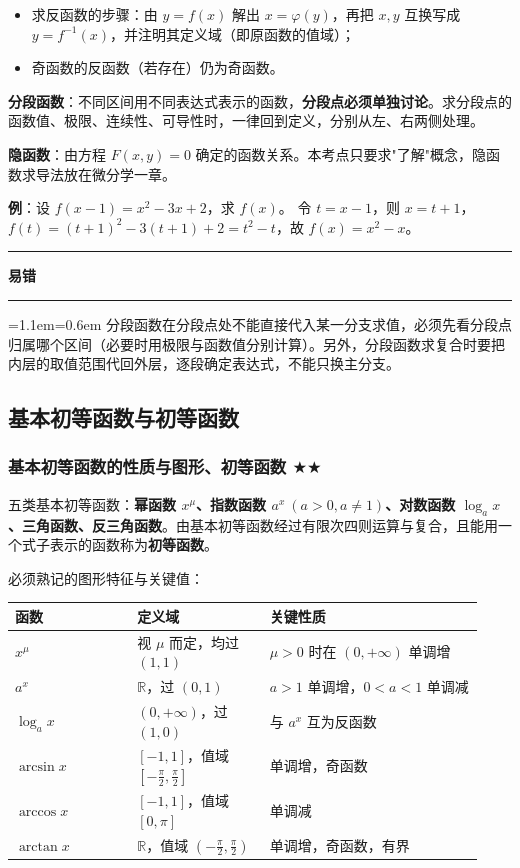 \documentclass[11pt,openany,UTF8]{ctexbook}
\newcommand{\callouthead}[2]{%
  \par\addvspace{7pt}\noindent
  {\color{#1}\rule[-0.15em]{3pt}{1.05em}}\hspace{0.5em}%
  {\bfseries\color{#1}#2}\par\nobreak\vspace{-0.35em}%
  {\color{rulesep}\hrule height 0.4pt}\nobreak\vspace{0.45em}%
  \begingroup\small\setlength{\parindent}{0pt}%
  \leftskip=1.1em\rightskip=0.6em\noindent\ignorespaces}
\newcommand{\calloutend}{\par\endgroup\addvspace{7pt}}
\newenvironment{callwarn}[1]{\callouthead{warnbar}{#1}}{\calloutend}
\begin{document}
\begin{itemize}
\item 求反函数的步骤：由 $y=f(x)$ 解出 $x=\varphi(y)$，再把 $x,y$ 互换写成 $y=f^{-1}(x)$，并注明其定义域（即原函数的值域）；
\item 奇函数的反函数（若存在）仍为奇函数。
\end{itemize}
\textbf{分段函数}：不同区间用不同表达式表示的函数，\textbf{分段点必须单独讨论}。求分段点的函数值、极限、连续性、可导性时，一律回到定义，分别从左、右两侧处理。

\textbf{隐函数}：由方程 $F(x,y)=0$ 确定的函数关系。本考点只要求"了解"概念，隐函数求导法放在微分学一章。

\textbf{例}：设 $f(x-1)=x^2-3x+2$，求 $f(x)$。 令 $t=x-1$，则 $x=t+1$，$f(t)=(t+1)^2-3(t+1)+2=t^2-t$，故 $f(x)=x^2-x$。

\begin{callwarn}{易错}
分段函数在分段点处不能直接代入某一分支求值，必须先看分段点归属哪个区间（必要时用极限与函数值分别计算）。另外，分段函数求复合时要把内层的取值范围代回外层，逐段确定表达式，不能只换主分支。

\end{callwarn}

\subsection{基本初等函数与初等函数}

\subsubsection{基本初等函数的性质与图形、初等函数 $\bigstar$$\bigstar$}

五类基本初等函数：\textbf{幂函数 $x^\mu$、指数函数 $a^x\ (a>0,a\ne 1)$、对数函数 $\log_a x$、三角函数、反三角函数}。由基本初等函数经过有限次四则运算与复合，且能用一个式子表示的函数称为\textbf{初等函数}。

必须熟记的图形特征与关键值：

\begingroup\small\setlength{\tabcolsep}{4.0pt}
\begin{longtable}{@{}L{0.2430\linewidth}L{0.2603\linewidth}L{0.4252\linewidth}@{}}
\toprule
\textbf{函数} & \textbf{定义域} & \textbf{关键性质} \\
\midrule
\endhead
$x^\mu$ & 视 $\mu$ 而定，均过 $(1,1)$ & $\mu>0$ 时在 $(0,+\infty)$ 单调增 \\
$a^x$ & $\mathbb{R}$，过 $(0,1)$ & $a>1$ 单调增，$0<a<1$ 单调减 \\
$\log_a x$ & $(0,+\infty)$，过 $(1,0)$ & 与 $a^x$ 互为反函数 \\
$\arcsin x$ & $[-1,1]$，值域 $\left[-\frac{\pi}{2},\frac{\pi}{2}\right]$ & 单调增，奇函数 \\
$\arccos x$ & $[-1,1]$，值域 $[0,\pi]$ & 单调减 \\
$\arctan x$ & $\mathbb{R}$，值域 $\left(-\frac{\pi}{2},\frac{\pi}{2}\right)$ & 单调增，奇函数，有界 \\
\bottomrule
\end{longtable}
\endgroup
\end{document}
